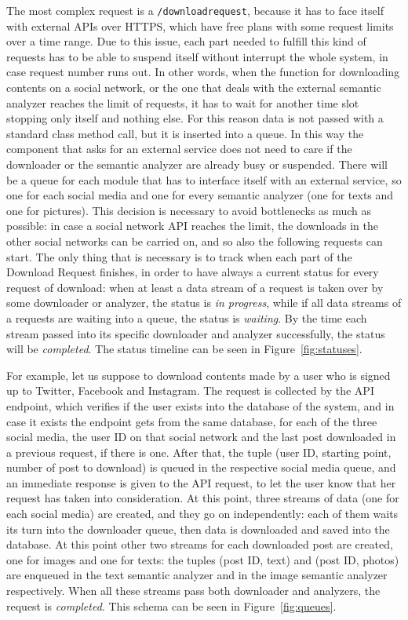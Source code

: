The most complex request is a \texttt{/downloadrequest}, because it has to face itself with external APIs over HTTPS, which have free plans with some request limits over a time range. Due to this issue, each part needed to fulfill this kind of requests has to be able to suspend itself without interrupt the whole system, in case request number runs out. In other words, when the function for downloading contents on a social network, or the one that deals with the external semantic analyzer reaches the limit of requests, it has to wait for another time slot stopping only itself and nothing else. For this reason data is not passed with a standard class method call, but it is inserted into a queue. In this way the component that asks for an external service does not need to care if the downloader or the semantic analyzer are already busy or suspended. There will be a queue for each module that has to interface itself with an external service, so one for each social media and one for every semantic analyzer (one for texts and one for pictures). This decision is necessary to avoid bottlenecks as much as possible: in case a social network API reaches the limit, the downloads in the other social networks can be carried on, and so also the following requests can start. The only thing that is necessary is to track when each part of the Download Request finishes, in order to have always a current status for every request of download: when at least a data stream of a request is taken over by some downloader or analyzer, the status is \emph{in progress}, while if all data streams of a requests are waiting into a queue, the status is \emph{waiting}. By the time each stream passed into its specific downloader and analyzer successfully, the status will be \emph{completed}. The status timeline can be seen in Figure~\ref{fig:statuses}.

For example, let us suppose to download contents made by a user who is signed up to Twitter, Facebook and Instagram. The request is collected by the API endpoint, which verifies if the user exists into the database of the system, and in case it exists the endpoint gets from the same database, for each of the three social media, the user ID on that social network and the last post downloaded in a previous request, if there is one. After that, the tuple (user ID, starting point, number of post to download) is queued in the respective social media queue, and an immediate response is given to the API request, to let the user know that her request has taken into consideration. At this point, three streams of data (one for each social media) are created, and they go on independently: each of them waits its turn into the downloader queue, then data is downloaded and saved into the database. At this point other two streams for each downloaded post are created, one for images and one for texts: the tuples (post ID, text) and (post ID, photos) are enqueued in the text semantic analyzer and in the image semantic analyzer respectively. When all these streams pass both downloader and analyzers, the request is \emph{completed}. This schema can be seen in Figure~\ref{fig:queues}.

